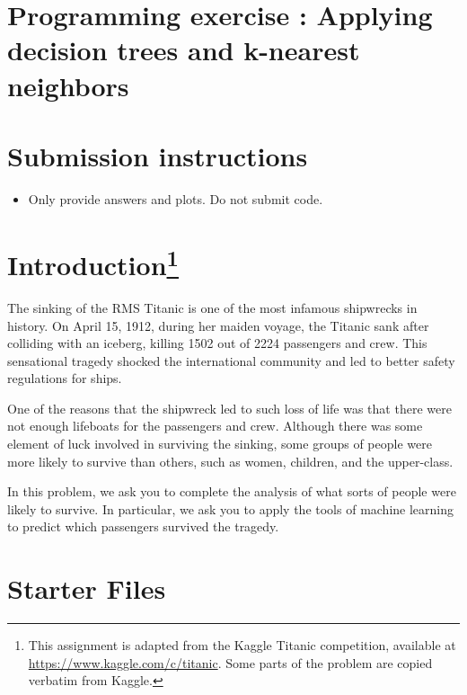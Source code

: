 \section{Programming exercise : Applying decision trees and k-nearest neighbors }
\ifsoln
\else
\section*{Submission instructions}
\begin{itemize}
\item Only provide answers and plots. Do not submit code.
\end{itemize}

\fi

\ifsoln
\else
\section*{Introduction\footnote{This assignment is adapted from the Kaggle Titanic competition, available at \url{https://www.kaggle.com/c/titanic}. Some parts of the problem are copied verbatim from Kaggle.}}

The sinking of the RMS Titanic is one of the most infamous shipwrecks in history.  On April 15, 1912, during her maiden voyage, the Titanic sank after colliding with an iceberg, killing 1502 out of 2224 passengers and crew. This sensational tragedy shocked the international community and led to better safety regulations for ships.

One of the reasons that the shipwreck led to such loss of life was that there were not enough lifeboats for the passengers and crew. Although there was some element of luck involved in surviving the sinking, some groups of people were more likely to survive than others, such as women, children, and the upper-class.

In this problem, we ask you to complete the analysis of what sorts of people were likely to survive. In particular, we ask you to apply the tools of machine learning to predict which passengers survived the tragedy.

\section*{Starter Files}

